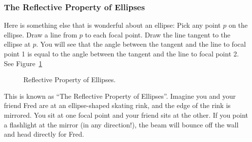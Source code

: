 \subsubsection{The Reflective Property of Ellipses}

Here is something else that is wonderful about an ellipse: Pick any
point $p$ on the ellipse. Draw a line from $p$ to each focal point.
Draw the line tangent to the ellipse at $p$. You will see that the angle between
the tangent and the line to focal point 1 is equal to the angle between the
tangent and the line to focal point 2. See Figure~\ref{fig:reflectiveEllipse}
\begin{figure}[htbp]
    \centering
    \caption{Reflective Property of Ellipses.}
    \label{fig:reflectiveEllipse}
\end{figure}

This is known as ``The Reflective Property of Ellipses''.
Imagine you and your friend Fred are at an ellipse-shaped skating rink, and the
edge of the rink is mirrored. You sit at one focal point and your friend
sits at the other. If you point a flashlight at the mirror (in any
direction!), the beam will bounce off the wall and head directly for
Fred.

